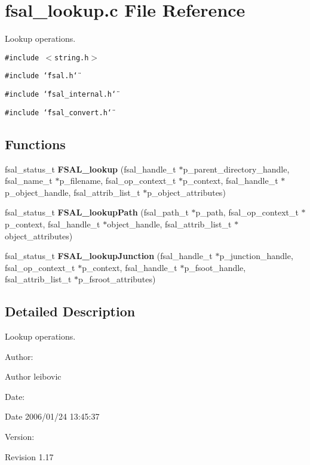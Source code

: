 \section{fsal\_\-lookup.c File Reference}
\label{fsal__lookup_8c}
Lookup operations.  


{\tt \#include $<$string.h$>$}\par
{\tt \#include \char`\"{}fsal.h\char`\"{}}\par
{\tt \#include \char`\"{}fsal\_\-internal.h\char`\"{}}\par
{\tt \#include \char`\"{}fsal\_\-convert.h\char`\"{}}\par
\subsection*{Functions}
\begin{CompactItemize}
\item 
fsal\_\-status\_\-t {\bf FSAL\_\-lookup} (fsal\_\-handle\_\-t $\ast$p\_\-parent\_\-directory\_\-handle, fsal\_\-name\_\-t $\ast$p\_\-filename, fsal\_\-op\_\-context\_\-t $\ast$p\_\-context, fsal\_\-handle\_\-t $\ast$p\_\-object\_\-handle, fsal\_\-attrib\_\-list\_\-t $\ast$p\_\-object\_\-attributes)
\item 
fsal\_\-status\_\-t {\bf FSAL\_\-lookupPath} (fsal\_\-path\_\-t $\ast$p\_\-path, fsal\_\-op\_\-context\_\-t $\ast$p\_\-context, fsal\_\-handle\_\-t $\ast$object\_\-handle, fsal\_\-attrib\_\-list\_\-t $\ast$object\_\-attributes)
\item 
fsal\_\-status\_\-t {\bf FSAL\_\-lookupJunction} (fsal\_\-handle\_\-t $\ast$p\_\-junction\_\-handle, fsal\_\-op\_\-context\_\-t $\ast$p\_\-context, fsal\_\-handle\_\-t $\ast$p\_\-fsoot\_\-handle, fsal\_\-attrib\_\-list\_\-t $\ast$p\_\-fsroot\_\-attributes)
\end{CompactItemize}


\subsection{Detailed Description}
Lookup operations. 

\begin{Desc}
\item[Author:]\end{Desc}
\begin{Desc}
\item[Author]leibovic \end{Desc}
\begin{Desc}
\item[Date:]\end{Desc}
\begin{Desc}
\item[Date]2006/01/24 13:45:37 \end{Desc}
\begin{Desc}
\item[Version:]\end{Desc}
\begin{Desc}
\item[Revision]1.17 \end{Desc}


